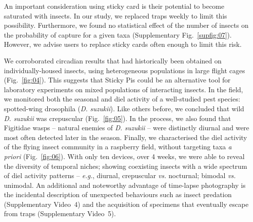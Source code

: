\documentclass[12pt]{article}
\begin{document}
\begin{linenumbers}
		
		An important consideration using sticky card is their potential to become saturated with insects. 
		In our study, we replaced traps weekly to limit this possibility. 
		Furthermore, we found no statistical effect of the number of insects on the probability of capture for a given taxa
		(Supplementary Fig.~\ref{supfig:07}). However, we advise users to replace sticky cards often enough to limit this risk.

					
		
		We corroborated circadian results that had historically been obtained on individually-housed insects, using heterogeneous populations in large flight cages (Fig.~\ref{fig:04}). This suggests that Sticky Pis could be an alternative tool for laboratory experiments on mixed populations of interacting insects. In the field, we monitored both the seasonal and diel activity of a well-studied pest species: spotted-wing drosophila (\emph{D. suzukii}). Like others before\cite{swoboda-bhattarai_diurnal_2020}, we concluded that wild \emph{D. suzukii} was crepuscular (Fig.~\ref{fig:05}). In the process, we also found that Figitidae wasps – natural enemies of \emph{D. suzukii} – were distinctly diurnal and were most often detected later in the season. Finally, we characterised the diel activity of the flying insect community in a raspberry field, without targeting taxa \emph{a priori} (Fig.~\ref{fig:06}). With only ten devices, over 4 weeks, we were able to reveal the diversity of temporal niches; showing coexisting insects with a wide spectrum of diel activity patterns – \emph{e.g.}, diurnal, crepuscular \emph{vs.} nocturnal; bimodal \emph{vs.} unimodal. An additional and noteworthy advantage of time-lapse photography is the incidental description of unexpected behaviours such as insect predation (Supplementary Video~4) and the acquisition of specimens that eventually escape from traps  (Supplementary Video~5).


\end{linenumbers}
\end{document}
